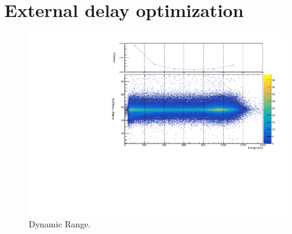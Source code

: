 \documentclass[a4paper,11pt]{article}
\begin{document}
\section{External delay optimization}

\begin{figure}[h!]
\centering
\includegraphics[width=\textwidth]{grafico_editato}
\caption{Dynamic Range.}
\end{figure}
\end{document}
